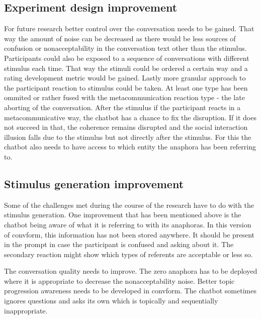 \documentclass[12pt]{report}
\begin{document}
{    \subsection{Experiment design improvement}

        For future research better control over the conversation needs to be gained.
        That way the amount of noise can be decreased as there would be less sources
        of confusion or nonacceptability in the conversation text other than the stimulus.
        Participants could also be exposed to a sequence of conversations with different stimulus each time.
        That way the stimuli could be ordered a certain way and a rating development metric would be gained.
        Lastly more granular approach to the participant reaction to stimulus could be taken.
        At least one type has been ommited or rather fused with the metacommunication reaction type -
        the late aborting of the conversation.
        After the stimulus if the participant reacts in a metacommunicative way,
        the chatbot has a chance to fix the disruption.
        If it does not succeed in that, the coherence remains disrupted and
        the social interaction illusion falls due to the stimulus but not directly after the stimulus.
        For this the chatbot also needs to have access to which entity the anaphora has been referring to.

    \subsection{Stimulus generation improvement}

        Some of the challenges met during the course of the research have to do with
        the stimulus generation.
        One improvement that has been mentioned above is the chatbot being aware of what it is referring to
        with its anaphoras.
        In this version of convform, this information has not been stored anywhere.
        It should be present in the prompt in case the participant is confused and asking about it.
        The secondary reaction might show which types of referents are acceptable or less so.

        The conversation quality needs to improve.
        The zero anaphora has to be deployed where it is appropriate to decrease the nonacceptability noise.
        Better topic progression awareness needs to be developed in convform.
        The chatbot sometimes ignores questions and asks its own which is topically and sequentially inappropriate.

}
\end{document}
